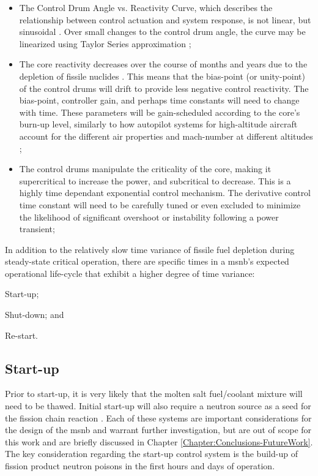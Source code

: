 \begin{itemize}
    \item The Control Drum Angle vs. Reactivity Curve, which describes the relationship between control actuation and system response, is not linear, but sinusoidal \cite{PetersonMS}. Over small changes to the control drum angle, the curve may be linearized using Taylor Series approximation \cite[Ch. 2]{Bequette};
    \item The core reactivity decreases over the course of months and years due to the depletion of fissile nuclides \cite[Ch. 7]{Lamarsh}. This means that the bias-point (or unity-point) of the control drums will drift to provide less negative control reactivity. The bias-point, controller gain, and perhaps time constants will need to change with time. These parameters will be gain-scheduled according to the core's burn-up level, similarly to how autopilot systems for high-altitude aircraft account for the different air properties and mach-number at different altitudes \cite{GainSchedule};
    \item The control drums manipulate the criticality of the core, making it supercritical to increase the power, and subcritical to decrease. This is a highly time dependant exponential control mechanism. The derivative control time constant will need to be carefully tuned or even excluded to minimize the likelihood of significant overshoot or instability following a power transient; 
\end{itemize}


In addition to the relatively slow time variance of fissile fuel depletion during steady-state critical operation, there are specific times in a \acs{msnb}'s expected operational life-cycle that exhibit a higher degree of time variance: 
\begin{enumerate*}
\item Start-up; \item Shut-down; and \item Re-start.
\end{enumerate*}

\subsection{Start-up}
Prior to start-up, it is very likely that the molten salt fuel/coolant mixture will need to be thawed. Initial start-up will also require a neutron source as a seed for the fission chain reaction \cite[Ch. 2]{DH}. Each of these systems are important considerations for the design of the \acs{msnb} and warrant further investigation, but are out of scope for this work and are briefly discussed in Chapter \ref{Chapter:Conclusions-FutureWork}. The key consideration regarding the start-up control system is the build-up of fission product neutron poisons in the first hours and days of operation.

